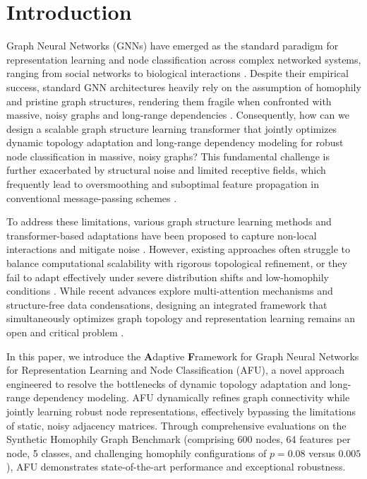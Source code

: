 \documentclass[10pt,twocolumn]{article}
\begin{document}
\section{Introduction}
Graph Neural Networks (GNNs) have emerged as the standard paradigm for representation learning and node classification across complex networked systems, ranging from social networks to biological interactions \cite{target_ref, ref_4}. Despite their empirical success, standard GNN architectures heavily rely on the assumption of homophily and pristine graph structures, rendering them fragile when confronted with massive, noisy graphs and long-range dependencies \cite{target_ref, ref_6}. Consequently, how can we design a scalable graph structure learning transformer that jointly optimizes dynamic topology adaptation and long-range dependency modeling for robust node classification in massive, noisy graphs? This fundamental challenge is further exacerbated by structural noise and limited receptive fields, which frequently lead to oversmoothing and suboptimal feature propagation in conventional message-passing schemes \cite{ref_2, ref_3}.

To address these limitations, various graph structure learning methods and transformer-based adaptations have been proposed to capture non-local interactions and mitigate noise \cite{target_ref, ref_5, ref_9}. However, existing approaches often struggle to balance computational scalability with rigorous topological refinement, or they fail to adapt effectively under severe distribution shifts and low-homophily conditions \cite{target_ref, ref_7}. While recent advances explore multi-attention mechanisms and structure-free data condensations, designing an integrated framework that simultaneously optimizes graph topology and representation learning remains an open and critical problem \cite{ref_5, ref_8, ref_9}.

In this paper, we introduce the \textbf{A}daptive \textbf{F}ramework for Graph Neural Networks for Representation Learning and Node Classification (\textsc{AFU}), a novel approach engineered to resolve the bottlenecks of dynamic topology adaptation and long-range dependency modeling. \textsc{AFU} dynamically refines graph connectivity while jointly learning robust node representations, effectively bypassing the limitations of static, noisy adjacency matrices. Through comprehensive evaluations on the Synthetic Homophily Graph Benchmark (comprising 600 nodes, 64 features per node, 5 classes, and challenging homophily configurations of $p=0.08$ versus $0.005$), \textsc{AFU} demonstrates state-of-the-art performance and exceptional robustness.
\end{document}
